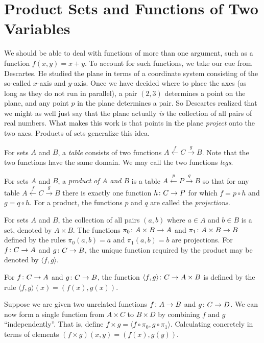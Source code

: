 \section{Product Sets and Functions of Two Variables}

We should be able to deal with functions of more than one argument, such as a function $f(x,y) = x+y$.
To account for such functions, we take our cue from Descartes.
He studied the plane in terms of a coordinate system consisting of the so-called $x$-axis and $y$-axis.
Once we have decided where to place the axes (as long as they do not run in parallel), a pair $(2,3)$ determines a point on the plane, and any point $p$ in the plane determines a pair.
So Descartes realized that we might as well just say that the plane actually \emph{is} the collection of all pairs of real numbers.
What makes this work is that points in the plane \emph{project} onto the two axes.
Products of sets generalize this idea.

\begin{defn}
For sets $A$ and $B$, a \emph{table} consists of two functions $A\stackrel{f}{\longleftarrow} C\stackrel{g}{\longrightarrow}B$.
Note that the two functions have the same domain. We may call the two functions \emph{legs}.

For sets $A$ and $B$, a \emph{product of $A$ and $B$} is a table $A\stackrel{p}{\longleftarrow} P\stackrel{q}{\longrightarrow}B$ so that for any table $A\stackrel{f}{\longleftarrow} C\stackrel{g}{\longrightarrow}B$ there is exactly one function ${h}\colon{C}\to{P}$ for which $f = p\circ h$ and $g= q\circ h$. 
For a product, the functions $p$ and $q$ are called the \emph{projections}.
\end{defn}

\begin{principle}\label{ax:products}
	For sets $A$ and $B$, the collection of all pairs $(a,b)$ where $a\in A$ and $b\in B$ is a set, denoted by $A\times B$. 
	The functions ${\pi_0}\colon{A\times B}\to{A}$ and ${\pi_1}\colon{A\times B}\to{B}$ defined by the rules $\pi_0(a,b)=a$
	and $\pi_1(a,b)=b$ are projections. For ${f}\colon{C}\to{A}$ and ${g}\colon{C}\to{B}$, the unique function required by
	the product may be denoted by $\langle f,g\rangle$.

	For ${f}\colon{C}\to{A}$ and ${g}\colon{C}\to{B}$, the function ${\langle f,g\rangle}\colon{C}\to{A\times B}$ is defined by the rule $\langle f,g\rangle(x)=(f(x),g(x))$.
\end{principle}

Suppose we are given two unrelated functions ${f}\colon{A}\to{B}$ and ${g}\colon{C}\to{D}$. 
We can now form a single function from $A\times C$ to $B\times D$ by combining $f$ and $g$ ``independently''. 
That is, define $f\times g = \langle f\circ \pi_0,g\circ \pi_1\rangle$.
Calculating concretely in terms of elements $(f\times g)(x,y) = (f(x),g(y))$. 

